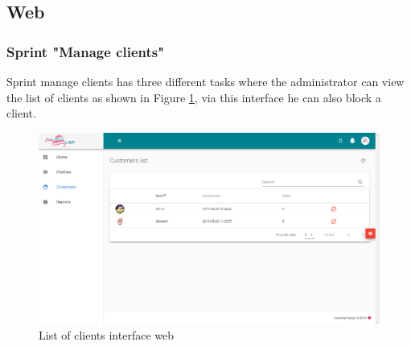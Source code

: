 \documentclass[12pt,a4paper]{report}
\begin{document}
\subsection{Web}
\subsubsection*{Sprint "Manage clients"}
Sprint manage clients has three different tasks where the administrator can view the list of clients as shown in Figure \ref{listclients-interface}, via this interface he can also block a client.
\begin{figure}[H]
	\centering
	\vspace*{1in}
	\includegraphics[width=7in,keepaspectratio]{listclients.png}
	\caption{List of clients interface web}
	\label{listclients-interface}
\end{figure} 
\clearpage
\end{document}
